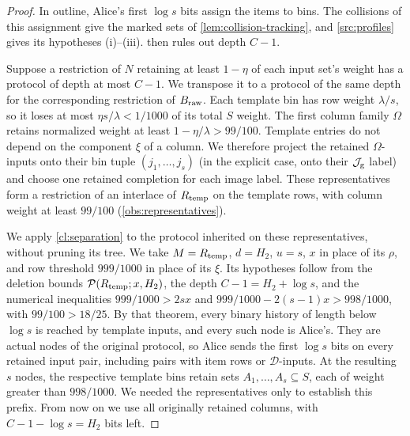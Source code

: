 \documentclass[11pt,letterpaper]{article} \usepackage[utf8]{inputenc}
\theoremstyle{plain} \newtheorem{theorem}{Theorem}[section]
\theoremstyle{definition} \newaliascnt{definition}{theorem}
\newcommand{\RP}[3]{\mathcal{P}(#1;#2,#3)}
\begin{document}
\begin{proof}
In outline, Alice's first $\log s$ bits assign the items
to bins. The collisions of this assignment give the marked sets of
\cref{lem:collision-tracking}, and \cref{src:profiles} gives its hypotheses
(i)--(iii).  then rules out depth $C-1$.

Suppose a restriction of $N$ retaining at least $1-\eta$ of each input set's
weight has a protocol of depth at most $C-1$.
We transpose it to a protocol of the same depth for the corresponding
restriction of $B_{\rm raw}$. Each template bin has row weight $\lambda/s$, so it
loses at most $\eta s/\lambda<1/1000$ of its total $S$ weight. The first column family $\Omega$
retains normalized weight at least $1-\eta/\lambda>99/100$.
Template entries do not depend on the component \(\xi\) of a column. We therefore project the retained
$\Omega$-inputs onto their bin tuple $(j_1,\ldots,j_s)$ (in the explicit
case, onto their $\mathcal J_{\rm g}$ label) and choose one retained
completion for each image label. These representatives form a restriction of an
interlace of $R_{\rm temp}$ on the template rows, with column weight at
least $99/100$ (\cref{obs:representatives}).

We apply \cref{cl:separation} to the protocol inherited on these
representatives, without pruning its tree. We take $M=R_{\rm temp}$,
$d=H_2$, $u=s$, $x$ in place of its $\rho$, and row threshold $999/1000$ in
place of its $\xi$. Its hypotheses follow
from the deletion bounds $\RP{R_{\rm temp}}{x}{H_2}$, the depth
$C-1=H_2+\log s$, and the numerical inequalities
$999/1000>2sx$ and $999/1000-2(s-1)x>998/1000$, with $99/100>18/25$.
By that theorem, every binary history of length below $\log s$ is reached by
template inputs, and every such node is Alice's. They are actual nodes of the
original protocol, so Alice sends the first $\log s$ bits on every retained
input pair, including pairs with item rows or $\mathcal D$-inputs. At the resulting $s$
nodes, the respective template bins retain sets $A_1,\ldots,A_s\subseteq S$,
each of weight greater than $998/1000$.
We needed the representatives only to establish this prefix. From now on we use
all originally retained columns, with $C-1-\log s=H_2$ bits left.


\end{proof}
\end{document}
